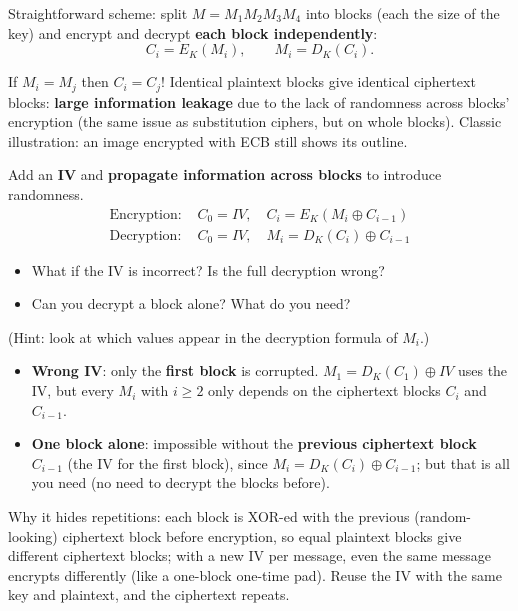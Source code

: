 \begin{defnbox}[title={Mode 1: Electronic Code Book (ECB)}]
Straightforward scheme: split $M = M_1 M_2 M_3 M_4$ into blocks (each the size of the key)
and encrypt and decrypt \textbf{each block independently}:
\[
  C_i = E_K(M_i), \qquad M_i = D_K(C_i).
\]
\end{defnbox}

\begin{warnbox}[title=The problem with ECB]
If $M_i = M_j$ then $C_i = C_j$! Identical plaintext blocks give identical ciphertext
blocks: \textbf{large information leakage} due to the lack of randomness across blocks'
encryption (the same issue as substitution ciphers, but on whole blocks). Classic
illustration: an image encrypted with ECB still shows its outline.
\end{warnbox}

\begin{defnbox}[title={Mode 2: Cipher Block Chaining (CBC)}]
Add an \textbf{IV} and \textbf{propagate information across blocks} to introduce
randomness.
\begin{align*}
  \text{Encryption: } & C_0 = IV, \quad C_i = E_K(M_i \oplus C_{i-1}) \\
  \text{Decryption: } & C_0 = IV, \quad M_i = D_K(C_i) \oplus C_{i-1}
\end{align*}
\end{defnbox}

\begin{rembox}[title=Questions from the lecture]
\begin{itemize}
  \item What if the IV is incorrect? Is the full decryption wrong?
  \item Can you decrypt a block alone? What do you need?
\end{itemize}
(Hint: look at which values appear in the decryption formula of $M_i$.)
\end{rembox}

\begin{algbox}[title=Answers]
\begin{itemize}
  \item \textbf{Wrong IV}: only the \textbf{first block} is corrupted. $M_1 = D_K(C_1) \oplus
        IV$ uses the IV, but every $M_i$ with $i \ge 2$ only depends on the ciphertext blocks
        $C_i$ and $C_{i-1}$.
  \item \textbf{One block alone}: impossible without the \textbf{previous ciphertext block}
        $C_{i-1}$ (the IV for the first block), since $M_i = D_K(C_i) \oplus C_{i-1}$; but that
        is all you need (no need to decrypt the blocks before).
\end{itemize}
Why it hides repetitions: each block is XOR-ed with the previous (random-looking) ciphertext
block before encryption, so equal plaintext blocks give different ciphertext blocks; with a new
IV per message, even the same message encrypts differently (like a one-block one-time pad). Reuse
the IV with the same key and plaintext, and the ciphertext repeats.
\end{algbox}

